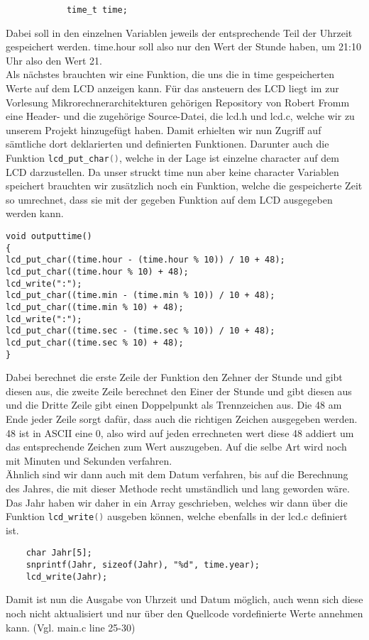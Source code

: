 \documentclass[openright,twoside,11pt,a4paper]{scrartcl}
\begin{document}
\begin{flushleft}
\begin{lstlisting}
			time_t time;
		\end{lstlisting}
		Dabei soll in den einzelnen Variablen jeweils der entsprechende Teil der Uhrzeit gespeichert werden. time.hour soll also nur den Wert der Stunde haben, um 21:10 Uhr also den Wert 21.\\
		Als nächstes brauchten wir eine Funktion, die uns die in time gespeicherten Werte auf dem LCD anzeigen kann. Für das ansteuern des LCD liegt im zur Vorlesung Mikrorechnerarchitekturen gehörigen Repository von Robert Fromm eine Header- und die zugehörige Source-Datei, die lcd.h und lcd.c, welche wir zu unserem Projekt hinzugefügt haben. Damit erhielten wir nun Zugriff auf sämtliche dort deklarierten und definierten Funktionen. Darunter auch die Funktion \lstinline[language=C++]|lcd_put_char()|, welche in der Lage ist einzelne  character auf dem LCD darzustellen. Da unser struckt time nun aber keine character Variablen speichert brauchten wir zusätzlich noch ein Funktion, welche die gespeicherte Zeit so umrechnet, dass sie mit der gegeben Funktion auf dem LCD ausgegeben werden kann. 
		\begin{lstlisting}
void outputtime()
{
lcd_put_char((time.hour - (time.hour % 10)) / 10 + 48);
lcd_put_char((time.hour % 10) + 48);
lcd_write(":");
lcd_put_char((time.min - (time.min % 10)) / 10 + 48);
lcd_put_char((time.min % 10) + 48);
lcd_write(":");
lcd_put_char((time.sec - (time.sec % 10)) / 10 + 48);
lcd_put_char((time.sec % 10) + 48);
}
		\end{lstlisting}
		Dabei berechnet die erste Zeile der Funktion den Zehner der Stunde und gibt diesen aus, die zweite Zeile berechnet den Einer der Stunde und gibt diesen aus und die Dritte Zeile gibt einen Doppelpunkt als Trennzeichen aus. Die 48 am Ende jeder Zeile sorgt dafür, dass auch die richtigen Zeichen ausgegeben werden. 48 ist in ASCII eine 0, also wird auf jeden errechneten wert diese 48 addiert um das entsprechende Zeichen zum Wert auszugeben. Auf die selbe Art wird noch mit Minuten und Sekunden verfahren.\\
		Ähnlich sind wir dann auch mit dem Datum verfahren, bis auf die Berechnung des Jahres, die mit dieser Methode recht umständlich und lang geworden wäre. Das Jahr haben wir daher in ein Array geschrieben, welches wir dann über die Funktion \lstinline[language=c++]|lcd_write()| ausgeben können, welche ebenfalls in der lcd.c definiert ist. \\
		\begin{lstlisting}
 	char Jahr[5];
	snprintf(Jahr, sizeof(Jahr), "%d", time.year);
	lcd_write(Jahr);
		\end{lstlisting}
		Damit ist nun die Ausgabe von Uhrzeit und Datum möglich, auch wenn sich diese noch nicht aktualisiert und nur über den Quellcode vordefinierte Werte annehmen kann. (Vgl. main.c line 25-30)
		

\end{flushleft}
\end{document}
